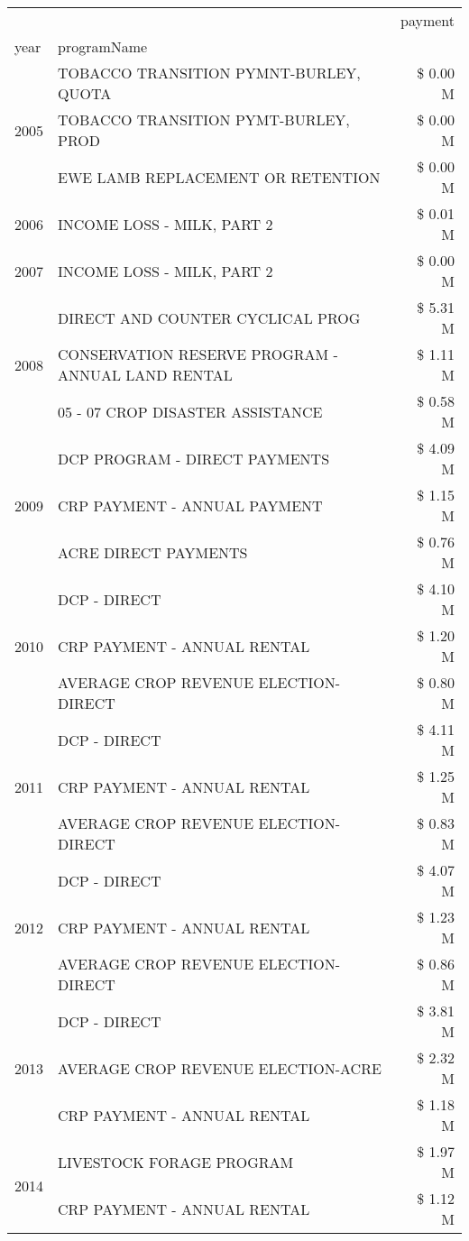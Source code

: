 \begin{tabular}{llr}
\toprule
 &  & payment \\
year & programName &  \\
\midrule
\multirow[t]{3}{*}{2005} & TOBACCO TRANSITION PYMNT-BURLEY, QUOTA & \$ 0.00 M \\
 & TOBACCO TRANSITION PYMT-BURLEY, PROD & \$ 0.00 M \\
 & EWE LAMB REPLACEMENT OR RETENTION & \$ 0.00 M \\
\cline{1-3}
2006 & INCOME LOSS - MILK, PART 2 & \$ 0.01 M \\
\cline{1-3}
2007 & INCOME LOSS - MILK, PART 2 & \$ 0.00 M \\
\cline{1-3}
\multirow[t]{3}{*}{2008} & DIRECT AND COUNTER CYCLICAL PROG & \$ 5.31 M \\
 & CONSERVATION RESERVE PROGRAM - ANNUAL LAND RENTAL & \$ 1.11 M \\
 & 05 - 07 CROP DISASTER ASSISTANCE & \$ 0.58 M \\
\cline{1-3}
\multirow[t]{3}{*}{2009} & DCP PROGRAM - DIRECT PAYMENTS & \$ 4.09 M \\
 & CRP PAYMENT - ANNUAL PAYMENT & \$ 1.15 M \\
 & ACRE DIRECT PAYMENTS & \$ 0.76 M \\
\cline{1-3}
\multirow[t]{3}{*}{2010} & DCP - DIRECT & \$ 4.10 M \\
 & CRP PAYMENT - ANNUAL RENTAL & \$ 1.20 M \\
 & AVERAGE CROP REVENUE ELECTION-DIRECT & \$ 0.80 M \\
\cline{1-3}
\multirow[t]{3}{*}{2011} & DCP - DIRECT & \$ 4.11 M \\
 & CRP PAYMENT - ANNUAL RENTAL & \$ 1.25 M \\
 & AVERAGE CROP REVENUE ELECTION-DIRECT & \$ 0.83 M \\
\cline{1-3}
\multirow[t]{3}{*}{2012} & DCP - DIRECT & \$ 4.07 M \\
 & CRP PAYMENT - ANNUAL RENTAL & \$ 1.23 M \\
 & AVERAGE CROP REVENUE ELECTION-DIRECT & \$ 0.86 M \\
\cline{1-3}
\multirow[t]{3}{*}{2013} & DCP - DIRECT & \$ 3.81 M \\
 & AVERAGE CROP REVENUE ELECTION-ACRE & \$ 2.32 M \\
 & CRP PAYMENT - ANNUAL RENTAL & \$ 1.18 M \\
\cline{1-3}
\multirow[t]{3}{*}{2014} & LIVESTOCK FORAGE PROGRAM & \$ 1.97 M \\
 & CRP PAYMENT - ANNUAL RENTAL & \$ 1.12 M \\

\end{tabular}
